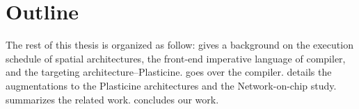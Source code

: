 

\section{Outline}
The rest of this thesis is organized as follow:
 gives a background on the execution schedule of spatial
architectures, the front-end imperative language of \name compiler, and the targeting architecture--Plasticine.
 goes over the \name compiler.
 details the augmentations to the Plasticine architectures and the
Network-on-chip study.
 summarizes the related work.
 concludes our work.
